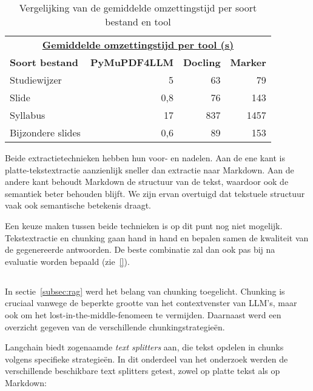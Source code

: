 \begin{table}
    \centering
    \begin{tabular}{p{4.5cm} r r r}
        \multicolumn{4}{c}{\uline{\textbf{Gemiddelde omzettingstijd per tool (s)}}} \\
        \addlinespace[0.5ex]
        \textbf{Soort bestand} & \textbf{PyMuPDF4LLM} & \textbf{Docling} & \textbf{Marker} \\
        \midrule
        Studiewijzer        & 5    & 63   & 79    \\
        Slide               & 0,8  & 76   & 143   \\
        Syllabus            & 17   & 837  & 1457  \\
        Bijzondere slides   & 0,6  & 89   & 153   \\
        \bottomrule
    \end{tabular}
    \caption{Vergelijking van de gemiddelde omzettingstijd per soort bestand en tool}
    \label{tab:markdown-omzettingstijden}
\end{table}

Beide extractietechnieken hebben hun voor- en nadelen. Aan de ene kant is platte-tekstextractie aanzienlijk sneller dan extractie naar Markdown. Aan de andere kant behoudt Markdown de structuur van de tekst, waardoor ook de semantiek beter behouden blijft. We zijn ervan overtuigd dat tekstuele structuur vaak ook semantische betekenis draagt.

Een keuze maken tussen beide technieken is op dit punt nog niet mogelijk. Tekstextractie en chunking gaan hand in hand en bepalen samen de kwaliteit van de gegenereerde antwoorden. De beste combinatie zal dan ook pas bij na evaluatie worden bepaald (zie~\ref{}).

\subsection{}%
\label{subsec:onderzoek-chunking}

In sectie~\ref{subsec:rag} werd het belang van chunking toegelicht. Chunking is cruciaal vanwege de beperkte grootte van het contextvenster van \acrshort{LLM}'s, maar ook om het lost-in-the-middle-fenomeen te vermijden. Daarnaast werd een overzicht gegeven van de verschillende chunkingstrategieën.

Langchain biedt zogenaamde \emph{text splitters} aan, die tekst opdelen in chunks volgens specifieke strategieën. In dit onderdeel van het onderzoek werden de verschillende beschikbare text splitters getest, zowel op platte tekst als op Markdown:

